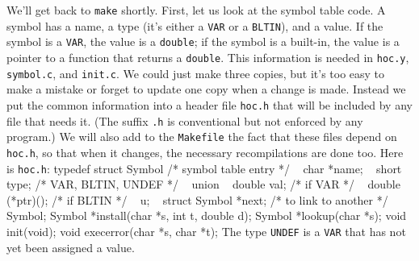 {We'll get back to {\tt make} shortly. First, let us look at
the symbol table code. A symbol has a name, a type (it's
either a {\tt VAR} or a {\tt BLTIN}), and a value. If the
symbol is a {\tt VAR}, the value is a {\tt double}; if the
symbol is a built-in, the value is a pointer to a function
that returns a {\tt double}. This information is needed in
{\tt hoc.y}, {\tt symbol.c}, and {\tt init.c}. We could just
make three copies, but it's too easy to make a mistake or
forget to update one copy when a change is made. Instead
we put the common information into a header file {\tt hoc.h}
that will be included by any file that needs it. (The suffix
{\tt.h} is conventional but not enforced by any program.)
We will also add to the {\tt Makefile} the fact that these
files depend on {\tt hoc.h}, so that when it changes, the
necessary recompilations are done too. Here is {\tt hoc.h}:
\begincode
typedef struct Symbol {  /* symbol table entry */
~       char    *name;
~       short   type;            /* VAR, BLTIN, UNDEF */
~       union {
~               double  val;            /* if VAR */
~               double  (*ptr)();       /* if BLTIN */
~       } u;
~       struct Symbol   *next;   /* to link to another */
} Symbol;
\smallskip
Symbol *install(char *s, int t, double d);
Symbol *lookup(char *s);
\smallskip
void init(void);
void execerror(char *s, char *t);
\endcode
\noindent
The type {\tt UNDEF} is a {\tt VAR} that has not yet been
assigned a value.

}
